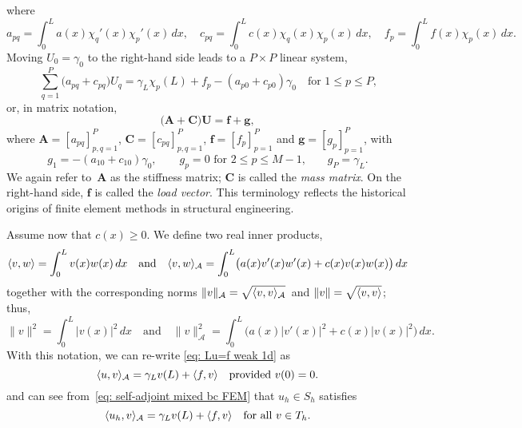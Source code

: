 where
\[
a_{pq}=\int_0^La(x)\chi_q'(x)\chi_p'(x)\,dx,\quad
c_{pq}=\int_0^Lc(x)\chi_q(x)\chi_p(x)\,dx,\quad
f_p=\int_0^Lf(x)\chi_p(x)\,dx.
\]
Moving $U_0=\gamma_0$ to the right-hand side leads to a $P\times P$ linear 
system,
\[
\sum_{q=1}^P\bigl(a_{pq}+c_{pq})U_q
    =\gamma_L\chi_p(L)+f_p-(a_{p0}+c_{p0})\gamma_0
    \quad\text{for $1\le p\le P$,}
\]
or, in matrix notation,
\begin{equation}\label{eq: self-adjoint mixed equations}
\bigl(\boldsymbol{A}+\boldsymbol{C}\bigr)\boldsymbol{U}
    =\boldsymbol{f}+\boldsymbol{g},
\end{equation}
where $\boldsymbol{A}=[a_{pq}]_{p,q=1}^P$, $\boldsymbol{C}=[c_{pq}]_{p,q=1}^P$,
$\boldsymbol{f}=[f_p]_{p=1}^P$ and $\boldsymbol{g}=[g_p]_{p=1}^P$, with
\[
g_1=-(a_{10}+c_{10})\gamma_0,\qquad
\text{$g_p=0$ for $2\le p\le M-1$,}\qquad
g_P=\gamma_L.
\]
We again refer to~$\boldsymbol{A}$ as the stiffness matrix;
$\boldsymbol{C}$ is called the \emph{mass matrix}.  On the right-hand side, 
$\boldsymbol{f}$ is called the \emph{load vector}.  This terminology reflects 
the historical origins of finite element methods in structural engineering.

Assume now that $c(x)\ge0$.  We define two real inner products,
\[
\langle v,w\rangle=\int_0^Lv(x)w(x)\,dx\quad\text{and}\quad
\langle v,w\rangle_{\mathcal{A}}=\int_0^L\bigl(a(x)v'(x)w'(x)+c(x)v(x)w(x)\bigr)\,dx
\]
together with the corresponding norms
$\|v\|_{\mathcal{A}}=\sqrt{\langle v,v\rangle_{\mathcal{A}}}$~and
$\|v\|=\sqrt{\langle v,v\rangle}$; thus,
\[
\|v\|^2=\int_0^L|v(x)|^2\,dx
\quad\text{and}\quad
\|v\|_{\mathcal{A}}^2=\int_0^L\bigl(a(x)|v'(x)|^2+c(x)|v(x)|^2\bigr)\,dx.
\]
With this notation, we can re-write \eqref{eq: Lu=f weak 1d} as
\begin{equation}\label{eq: <u,v>A}
\langle u,v\rangle_{\mathcal{A}}=\gamma_Lv(L)+\langle f,v\rangle\quad\text{provided $v(0)=0$.}
\end{equation}
and can see from~\eqref{eq: self-adjoint mixed bc FEM} that $u_h\in S_h$
satisfies
\begin{equation}\label{eq: <uh,v>A}
\langle u_h,v\rangle_{\mathcal{A}}=\gamma_Lv(L)+\langle f,v\rangle
	\quad\text{for all $v\in T_h$.}
\end{equation}

